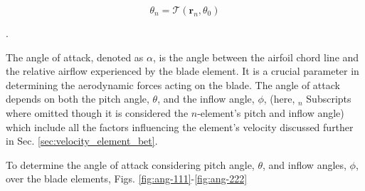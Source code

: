 \begin{equation}
    \theta_n = \mathcal{T}(\mathbf{r}_n, \theta_0)
\end{equation}

\noindent {}.

The angle of attack, denoted as $\alpha$, is the angle between the airfoil chord line and the relative airflow experienced by the blade element. It is a crucial parameter in determining the aerodynamic forces acting on the blade. The angle of attack depends on both the pitch angle, $\theta$, and the inflow angle, $\phi$, (here, $_n$ Subscripts where omitted though it is considered the $n$-element's pitch and inflow angle) which include  all the factors influencing the element's velocity discussed further in Sec. \ref{sec:velocity_element_bet}. 

To determine the angle of attack considering  pitch angle, $\theta$, and inflow angles, $\phi$, over the blade  elements, Figs. \ref{fig:ang-111}-\ref{fig:ang-222}


